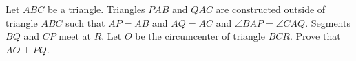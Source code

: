 Let $ABC$ be a triangle. Triangles $PAB$ and $QAC$ are constructed outside of triangle $ABC$ such that $AP = AB$ and $AQ = AC$ and $\angle{BAP}= \angle{CAQ}$. Segments $BQ$ and $CP$ meet at $R$. Let $O$ be the circumcenter of triangle $BCR$. Prove that $AO \perp PQ$.
